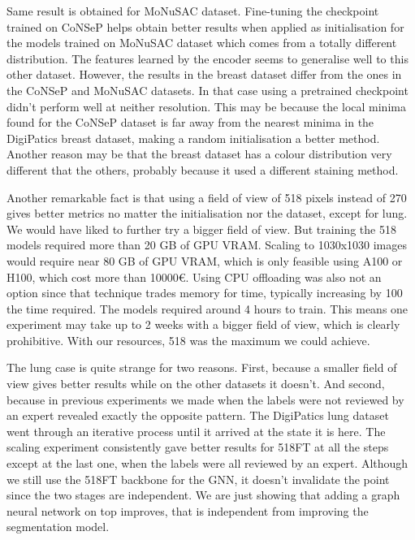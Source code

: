 Same result is obtained for MoNuSAC dataset. Fine-tuning the checkpoint trained on CoNSeP helps obtain better results when applied as initialisation for the models trained on MoNuSAC dataset which comes from a totally different distribution. The features learned by the encoder seems to generalise well to this other dataset. However, the results in the breast dataset differ from the ones in the CoNSeP and MoNuSAC datasets. In that case using a pretrained checkpoint didn't perform well at neither resolution. This may be because the local minima found for the CoNSeP dataset is far away from the nearest minima in the DigiPatics breast dataset, making a random initialisation a better method. Another reason may be that the breast dataset has a colour distribution very different that the others, probably because it used a different staining method.

Another remarkable fact is that using a field of view of 518 pixels instead of 270 gives better metrics no matter the initialisation nor the dataset, except for lung. We would have liked to further try a bigger field of view. But training the 518 models required more than 20 GB of GPU VRAM. Scaling to 1030x1030 images would require near 80 GB of GPU VRAM, which is only feasible using A100 or H100, which cost more than 10000€. Using CPU offloading was also not an option since that technique trades memory for time, typically increasing by 100 the time required. The models required around 4 hours to train. This means one experiment may take up to 2 weeks with a bigger field of view, which is clearly prohibitive. With our resources, 518 was the maximum we could achieve.

The lung case is quite strange for two reasons. First, because a smaller field of view gives better results while on the other datasets it doesn't. And second, because in previous experiments we made when the labels were not reviewed by an expert revealed exactly the opposite pattern. The DigiPatics lung dataset went through an iterative process until it arrived at the state it is here. The scaling experiment consistently gave better results for 518FT at all the steps except at the last one, when the labels were all reviewed by an expert. Although we still use the 518FT backbone for the GNN, it doesn't invalidate the point since the two stages are independent. We are just showing that adding a graph neural network on top improves, that is independent from improving the segmentation model.

